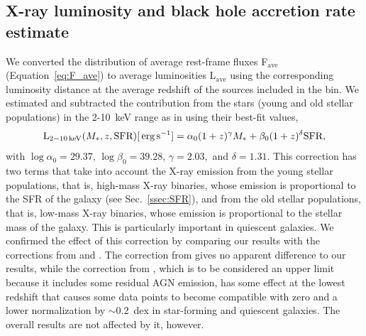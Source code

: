 \subsection{X-ray luminosity and black hole accretion rate estimate} \label{subsec:LX_BHAR}
We converted the distribution of average rest-frame fluxes F$_\text{ave}$  %
(Equation~\ref{eq:F_ave}) to average luminosities L$_\text{ave}$ %
 using the corresponding luminosity distance at the average redshift of the sources included in the bin. We estimated and subtracted the contribution from the stars (young and old stellar populations) in the 2-10~keV range as in \citet{2016ApJ...825....7L} using their best-fit values,
\begin{equation}  \label{eq:XSFR}
\centering
\text{L}_{2-10\um{keV}}(M_*,z,\text{SFR})[\um{erg}\ump{s}{-1}]=\alpha_0(1+z)^\gamma M_*+\beta_0(1+z)^\delta \text{SFR}
,\end{equation}
with $\log\alpha_0=29.37$, $\log\beta_0=39.28$, $\gamma= 2.03,$ and $\delta=1.31$. This correction has two terms that take into account the X-ray emission from the young stellar populations, that is, high-mass X-ray binaries, whose emission is proportional to the SFR of the galaxy (see Sec.~\ref{ssec:SFR}), and from the old stellar populations, that is, low-mass X-ray binaries, whose emission is proportional to the stellar mass of the galaxy. This is particularly important in quiescent galaxies. We confirmed the effect of this correction by comparing our results with the corrections  from \citet{2018ApJ...865...43F} and \citet{2017MNRAS.465.3390A}. The correction from \citet{2017MNRAS.465.3390A} gives no apparent difference to our results, while the correction from \citeauthor{2018ApJ...865...43F}, which is to be considered an upper limit because it includes some residual AGN emission, has some effect at the lowest redshift that causes some data points to become compatible with zero and a lower normalization by $\sim0.2$~dex in star-forming and quiescent galaxies. The overall results are not affected by it, however.


